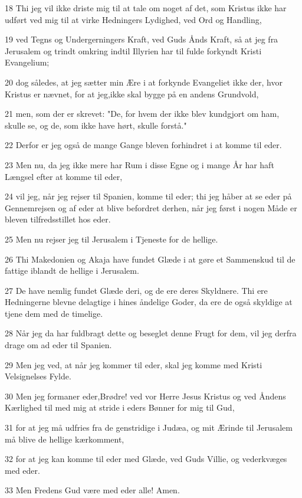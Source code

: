 \par 18 Thi jeg vil ikke driste mig til at tale om noget af det, som Kristus ikke har udført ved mig til at virke Hedningers Lydighed, ved Ord og Handling,
\par 19 ved Tegns og Undergerningers Kraft, ved Guds Ånds Kraft, så at jeg fra Jerusalem og trindt omkring indtil Illyrien har til fulde forkyndt Kristi Evangelium;
\par 20 dog således, at jeg sætter min Ære i at forkynde Evangeliet ikke der, hvor Kristus er nævnet, for at jeg,ikke skal bygge på en andens Grundvold,
\par 21 men, som der er skrevet: "De, for hvem der ikke blev kundgjort om ham, skulle se, og de, som ikke have hørt, skulle forstå."
\par 22 Derfor er jeg også de mange Gange bleven forhindret i at komme til eder.
\par 23 Men nu, da jeg ikke mere har Rum i disse Egne og i mange År har haft Længsel efter at komme til eder,
\par 24 vil jeg, når jeg rejser til Spanien, komme til eder; thi jeg håber at se eder på Gennemrejsen og af eder at blive befordret derhen, når jeg først i nogen Måde er bleven tilfredsstillet hos eder.
\par 25 Men nu rejser jeg til Jerusalem i Tjeneste for de hellige.
\par 26 Thi Makedonien og Akaja have fundet Glæde i at gøre et Sammenskud til de fattige iblandt de hellige i Jerusalem.
\par 27 De have nemlig fundet Glæde deri, og de ere deres Skyldnere. Thi ere Hedningerne blevne delagtige i hines åndelige Goder, da ere de også skyldige at tjene dem med de timelige.
\par 28 Når jeg da har fuldbragt dette og beseglet denne Frugt for dem, vil jeg derfra drage om ad eder til Spanien.
\par 29 Men jeg ved, at når jeg kommer til eder, skal jeg komme med Kristi Velsignelses Fylde.
\par 30 Men jeg formaner eder,Brødre! ved vor Herre Jesus Kristus og ved Åndens Kærlighed til med mig at stride i eders Bønner for mig til Gud,
\par 31 for at jeg må udfries fra de genstridige i Judæa, og mit Ærinde til Jerusalem må blive de hellige kærkomment,
\par 32 for at jeg kan komme til eder med Glæde, ved Guds Villie, og vederkvæges med eder.
\par 33 Men Fredens Gud være med eder alle! Amen.

